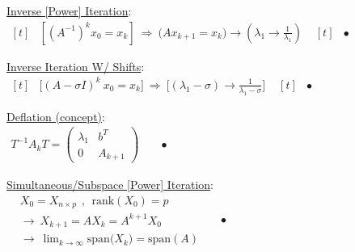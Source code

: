 \documentclass[12pt]{article}
\begin{document}
\underline{Inverse [Power] Iteration}:\\[15pt]
\(\begin{aligned}[t]
	&\left[ \left( A^{-1} \right)^k x_0 = x_{k} \right]
		\ \Rightarrow\ \boxed{ \big( A x_{k+1} = x_k \big)
		\rightarrow \left( \lambda_1 \rightarrow \tfrac{1}{\lambda_1} \right) }
\end{aligned}\)
\hfill
\(\begin{aligned}[t]
	&\bullet\ 
\end{aligned}\)

\vspace{15pt}
\underline{Inverse Iteration W/ Shifts}:\\[15pt]
\(\begin{aligned}[t]
	&\boxed{ \Big[ ({\scriptstyle A-\sigma I})^k\ x_0 = x_{k} \Big]
		\ \Rightarrow\ \Big[ ({\scriptstyle \lambda_1 - \sigma}) \rightarrow \tfrac{1}{\lambda_1 - \sigma} \Big] }
\end{aligned}\)
\hfill
\(\begin{aligned}[t]
	&\bullet\ 
\end{aligned}\)

\vspace{15pt}
\underline{Deflation (concept)}:\\[15pt]
\(\begin{aligned}
	T^{-1}A_kT = 
		\left( \begin{matrix}
			\lambda_1 & b^T\\
			0 & A_{k+1}
		\end{matrix} \right)
\end{aligned}\)
\hfill
\(\begin{aligned}
	&\bullet\
\end{aligned}\)

\vspace{15pt}
\underline{Simultaneous/Subspace [Power] Iteration}:\\[10pt]
\(\begin{aligned}
	&X_0 = X_{n \times p} 
		\ \ , \ \ \text{rank}(X_0) = p 
		\\[10pt]
	&\rightarrow \ X_{k+1} = AX_k = A^{k+1} X_0\\
	&\rightarrow \ \lim_{k \rightarrow \infty} \text{span} \big( X_k \big) = \text{span}(A) 
\end{aligned}\)
\hfill
\(\begin{aligned}
	&\bullet\
\end{aligned}\)
\end{document}
